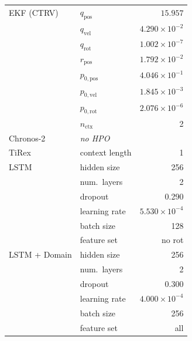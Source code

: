 \begin{table}[t]
\begin{tabular}{llr}
  EKF (CTRV)
  & \cellcolor{green!15}$q_\text{pos}$            & \cellcolor{green!15}$15.957$ \\
  & $q_\text{vel}$            & $4.290 \times 10^{-2}$ \\
  & \cellcolor{green!15}$q_\text{rot}$            & \cellcolor{green!15}$1.002 \times 10^{-7}$ \\
  & $r_\text{pos}$            & $1.792 \times 10^{-2}$ \\
  & $p_{0,\text{pos}}$        & $4.046 \times 10^{-1}$ \\
  & $p_{0,\text{vel}}$        & $1.845 \times 10^{-3}$ \\
  & $p_{0,\text{rot}}$        & $2.076 \times 10^{-6}$ \\
  & $n_\text{ctx}$            & 2 \\
\midrule
Chronos-2
  & \multicolumn{2}{l}{\textit{no HPO}} \\
TiRex
  & context length            & 1\\
\midrule
LSTM
  & hidden size               & 256 \\
  & num.\ layers              & 2 \\
  & dropout                   & 0.290 \\
  & learning rate             & $5.530 \times 10^{-4}$ \\
  & batch size                & 128 \\
  & \cellcolor{orange!15}feature set               & \cellcolor{orange!15}no rot\\
  \midrule
LSTM + Domain
  & hidden size               & 256 \\
  & num.\ layers              & 2 \\
  & dropout                   & 0.300 \\
  & learning rate             & $4.000 \times 10^{-4}$ \\
  & batch size                & 256 \\
  & feature set               & all\\
\bottomrule
\end{tabular}
\end{table}

